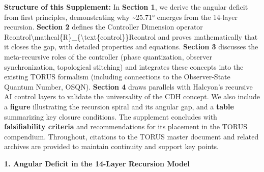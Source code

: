 \documentclass[
]{article}
\begin{document}
\textbf{Structure of this Supplement:} In \textbf{Section 1}, we derive
the angular deficit from first principles, demonstrating why
\textasciitilde25.71° emerges from the 14-layer recursion.
\textbf{Section 2} defines the Controller Dimension operator
Rcontrol\textbackslash mathcal\{R\}\_\{\textbackslash text\{control\}\}Rcontrol\hspace{0pt}
and proves mathematically that it closes the gap, with detailed
properties and equations. \textbf{Section 3} discusses the
meta-recursive roles of the controller (phase quantization, observer
synchronization, topological stitching) and integrates these concepts
into the existing TORUS formalism (including connections to the
Observer-State Quantum Number, OSQN). \textbf{Section 4} draws parallels
with Halcyon's recursive AI control layers to validate the universality
of the CDH concept. We also include a \textbf{figure} illustrating the
recursion spiral and its angular gap, and a \textbf{table} summarizing
key closure conditions. The supplement concludes with
\textbf{falsifiability criteria} and recommendations for its placement
in the TORUS compendium. Throughout, citations to the TORUS master
document and related archives are provided to maintain continuity and
support key points.

\textbf{1. Angular Deficit in the 14-Layer Recursion Model}
\end{document}
